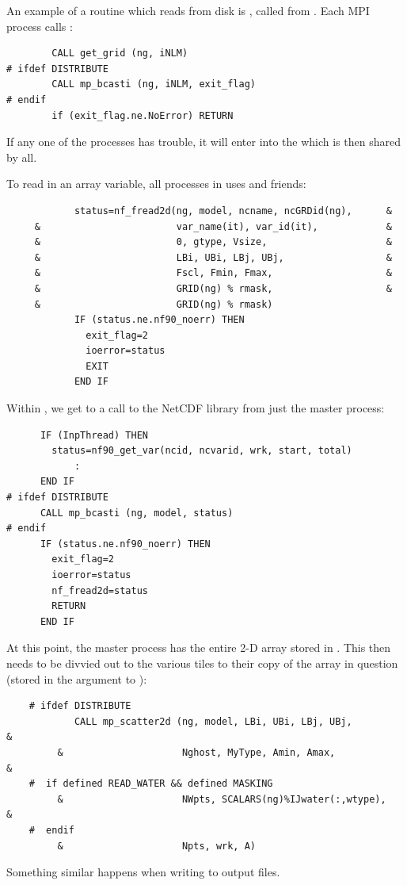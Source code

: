 An example of a routine which reads from disk is ,
called from . Each MPI process calls :
\begin{verbatim}
        CALL get_grid (ng, iNLM)
# ifdef DISTRIBUTE
        CALL mp_bcasti (ng, iNLM, exit_flag)
# endif
        if (exit_flag.ne.NoError) RETURN
\end{verbatim}
If any one of the processes has trouble, it will enter into the
 which is then shared by all.

To read in an array variable, all processes in  uses
 and friends:
\begin{verbatim}
            status=nf_fread2d(ng, model, ncname, ncGRDid(ng),      &
     &                        var_name(it), var_id(it),            &
     &                        0, gtype, Vsize,                     &
     &                        LBi, UBi, LBj, UBj,                  &
     &                        Fscl, Fmin, Fmax,                    &
     &                        GRID(ng) % rmask,                    &
     &                        GRID(ng) % rmask)
            IF (status.ne.nf90_noerr) THEN
              exit_flag=2
              ioerror=status
              EXIT
            END IF
\end{verbatim}
Within , we get to a call to the NetCDF library
from just the master process:
\begin{verbatim}
      IF (InpThread) THEN
        status=nf90_get_var(ncid, ncvarid, wrk, start, total)
            :
      END IF
# ifdef DISTRIBUTE
      CALL mp_bcasti (ng, model, status)
# endif
      IF (status.ne.nf90_noerr) THEN
        exit_flag=2
        ioerror=status
        nf_fread2d=status
        RETURN
      END IF
\end{verbatim}
At this point, the master process has the entire 2-D array stored in
. This then needs to be divvied out to the various tiles
to their copy of the array in question (stored in the 
argument to ):
\begin{verbatim}
    # ifdef DISTRIBUTE
            CALL mp_scatter2d (ng, model, LBi, UBi, LBj, UBj,         &
         &                     Nghost, MyType, Amin, Amax,            &
    #  if defined READ_WATER && defined MASKING
         &                     NWpts, SCALARS(ng)%IJwater(:,wtype),   &
    #  endif
         &                     Npts, wrk, A)
\end{verbatim}
Something similar happens when writing to output files.
